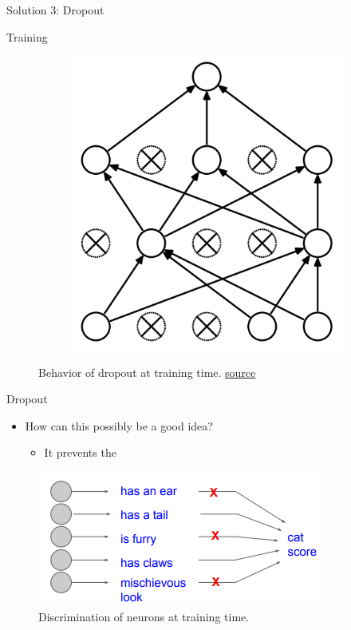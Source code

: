 \begin{frame}{Solution 3: Dropout}
\begin{block}{Training}
\begin{figure}[H]
\begin{subfigure}[b]{0.45\textwidth}
				\includegraphics[height=0.4\textheight]{Figs/Dropout-after.png}
			\end{subfigure}
			\caption{Behavior of dropout at training time. \href{https://www.cs.toronto.edu/~hinton/absps/JMLRdropout.pdf}{source}}
		\end{figure}
	\end{block}
\end{frame}
\begin{frame}{Dropout}
	\begin{itemize}
		\item How can this possibly be a good idea?
		\medskip
		\begin{itemize}
			\item It prevents the 
		\end{itemize}
	\end{itemize}
	\begin{figure}[H]
		\centering
		\includegraphics[height=0.4\textheight]{Figs/section_4/dropout_why.png}
		\caption{Discrimination of neurons at training time. \cite{cs231n-2018-lecture7}}
	\end{figure}
\end{frame}
